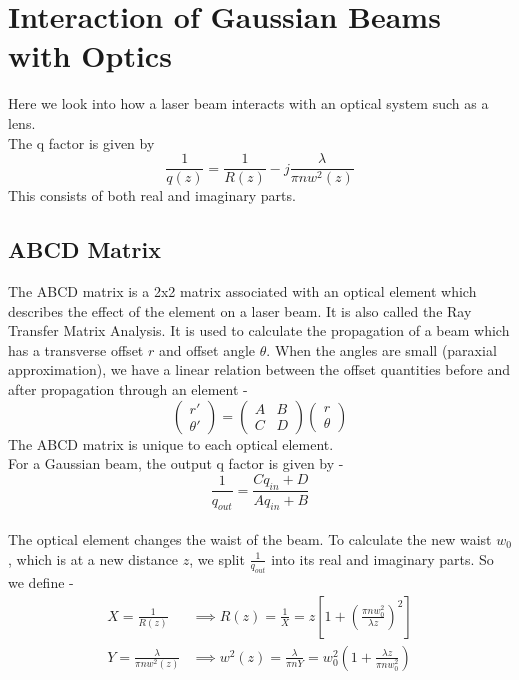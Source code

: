 \documentclass{article}[11pt]
\begin{document}
\newpage

\section{Interaction of Gaussian Beams with Optics}
Here we look into how a laser beam interacts with an optical system such as a lens.
\medskip
\\
The q factor is given by 
$$\frac{1}{q(z)} = \frac{1}{R(z)} - j \frac{\lambda}{\pi n w^2(z)}$$
This consists of both real and imaginary parts. 

\subsection{ABCD Matrix}
The ABCD matrix is a 2x2 matrix associated with an optical element which describes the effect of the element on a laser beam. It is also called the Ray Transfer Matrix Analysis. It is used to calculate the propagation of a beam which has a transverse offset $r$ and offset angle $\theta$. When the angles are small (paraxial approximation), we have a linear relation between the offset quantities before and after propagation through an element -
$$\begin{pmatrix}
r' \\ \theta'
\end{pmatrix} = 
\begin{pmatrix}
A & B \\ C & D
\end{pmatrix}
\begin{pmatrix}
r \\ \theta
\end{pmatrix}$$
The ABCD matrix is unique to each optical element.
\medskip
\\
For a Gaussian beam, the output q factor is given by -
$$\frac{1}{q_{out}} = \frac{C q_{in} + D}{A q_{in} + B}$$
\\
The optical element changes the waist of the beam. To calculate the new waist $w_0$, which is at a new distance $z$, we split $\frac{1}{q_{out}}$ into its real and imaginary parts. So we define -
\begin{align*}
    X = \frac{1}{R(z)} &\implies R(z) = \frac{1}{X} = z \left[ 1 + \left( \frac{\pi n w_0^2}{\lambda z} \right)^2 \right] \\
    Y = \frac{\lambda}{\pi n w^2(z)} &\implies w^2 (z) = \frac{\lambda}{\pi n Y} = w_0^2 \left( 1 + \frac{\lambda z}{\pi n w_0^2} \right) \\
\end{align*}
\end{document}

